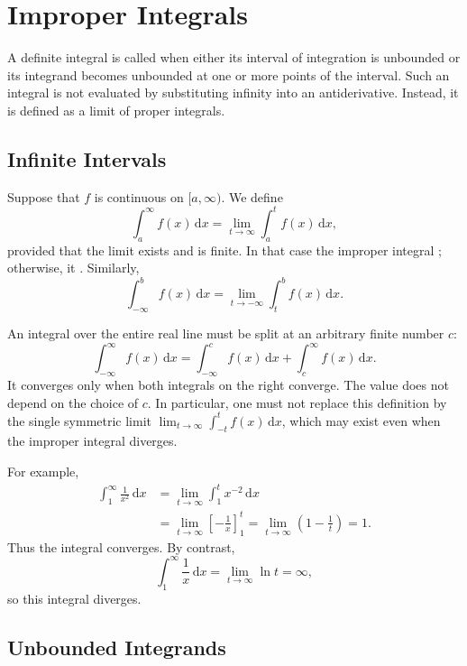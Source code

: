 \section{Improper Integrals}

A definite integral is called  when either its interval of
integration is unbounded or its integrand becomes unbounded at one or more
points of the interval.  Such an integral is not evaluated by substituting
infinity into an antiderivative.  Instead, it is defined as a limit of proper
integrals.

\subsection{Infinite Intervals}

Suppose that \(f\) is continuous on \([a,\infty)\).  We define
\[
    \int_a^\infty f(x)\,\mathrm{d}x
    =\lim_{t\to\infty}\int_a^t f(x)\,\mathrm{d}x,
\]
provided that the limit exists and is finite.  In that case the improper
integral ; otherwise, it .  Similarly,
\[
    \int_{-\infty}^b f(x)\,\mathrm{d}x
    =\lim_{t\to-\infty}\int_t^b f(x)\,\mathrm{d}x.
\]

An integral over the entire real line must be split at an arbitrary finite
number \(c\):
\[
    \int_{-\infty}^{\infty}f(x)\,\mathrm{d}x
    =\int_{-\infty}^{c}f(x)\,\mathrm{d}x
     +\int_c^{\infty}f(x)\,\mathrm{d}x.
\]
It converges only when both integrals on the right converge.  The value does
not depend on the choice of \(c\).  In particular, one must not replace this
definition by the single symmetric limit
\(\lim_{t\to\infty}\int_{-t}^{t}f(x)\,\mathrm{d}x\), which may exist even
when the improper integral diverges.

For example,
\begin{align*}
    \int_1^\infty \frac{1}{x^2}\,\mathrm{d}x
    &=\lim_{t\to\infty}\int_1^t x^{-2}\,\mathrm{d}x \\
    &=\lim_{t\to\infty}\left[-\frac1x\right]_1^t
      =\lim_{t\to\infty}\left(1-\frac1t\right)=1.
\end{align*}
Thus the integral converges.  By contrast,
\[
    \int_1^\infty\frac1x\,\mathrm{d}x
    =\lim_{t\to\infty}\ln t
    =\infty,
\]
so this integral diverges.

\subsection{Unbounded Integrands}

